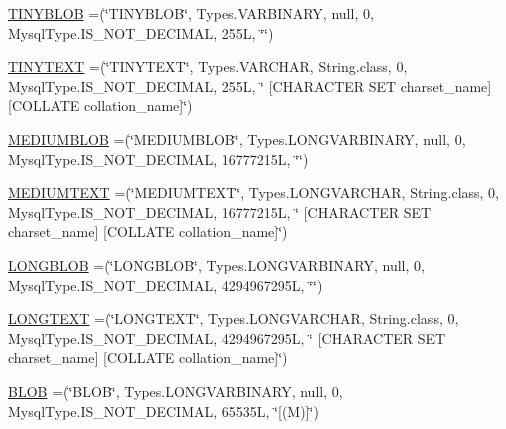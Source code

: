 \begin{DoxyCompactItemize}
\item 
\mbox{\hyperlink{enumcom_1_1mysql_1_1cj_1_1_mysql_type_a55c5e7d63a690905687b7fa55342dd9c}{T\+I\+N\+Y\+B\+L\+OB}} =(\char`\"{}T\+I\+N\+Y\+B\+L\+OB\char`\"{}, Types.\+V\+A\+R\+B\+I\+N\+A\+RY, null, 0, Mysql\+Type.\+I\+S\+\_\+\+N\+O\+T\+\_\+\+D\+E\+C\+I\+M\+AL, 255\+L, \char`\"{}\char`\"{})
\item 
\mbox{\hyperlink{enumcom_1_1mysql_1_1cj_1_1_mysql_type_a86e06f00235ee92184960c872d76076f}{T\+I\+N\+Y\+T\+E\+XT}} =(\char`\"{}T\+I\+N\+Y\+T\+E\+XT\char`\"{}, Types.\+V\+A\+R\+C\+H\+AR, String.\+class, 0, Mysql\+Type.\+I\+S\+\_\+\+N\+O\+T\+\_\+\+D\+E\+C\+I\+M\+AL, 255\+L, \char`\"{} \mbox{[}\+C\+H\+A\+R\+A\+C\+T\+E\+R S\+E\+T charset\+\_\+name\mbox{]} \mbox{[}\+C\+O\+L\+L\+A\+T\+E collation\+\_\+name\mbox{]}\char`\"{})
\item 
\mbox{\hyperlink{enumcom_1_1mysql_1_1cj_1_1_mysql_type_a7a690573bfaf820db73489978040f19d}{M\+E\+D\+I\+U\+M\+B\+L\+OB}} =(\char`\"{}M\+E\+D\+I\+U\+M\+B\+L\+OB\char`\"{}, Types.\+L\+O\+N\+G\+V\+A\+R\+B\+I\+N\+A\+RY, null, 0, Mysql\+Type.\+I\+S\+\_\+\+N\+O\+T\+\_\+\+D\+E\+C\+I\+M\+AL, 16777215\+L, \char`\"{}\char`\"{})
\item 
\mbox{\hyperlink{enumcom_1_1mysql_1_1cj_1_1_mysql_type_a8152d42c2961d0e081e76dbbadd7b4f2}{M\+E\+D\+I\+U\+M\+T\+E\+XT}} =(\char`\"{}M\+E\+D\+I\+U\+M\+T\+E\+XT\char`\"{}, Types.\+L\+O\+N\+G\+V\+A\+R\+C\+H\+AR, String.\+class, 0, Mysql\+Type.\+I\+S\+\_\+\+N\+O\+T\+\_\+\+D\+E\+C\+I\+M\+AL, 16777215\+L, \char`\"{} \mbox{[}\+C\+H\+A\+R\+A\+C\+T\+E\+R S\+E\+T charset\+\_\+name\mbox{]} \mbox{[}\+C\+O\+L\+L\+A\+T\+E collation\+\_\+name\mbox{]}\char`\"{})
\item 
\mbox{\hyperlink{enumcom_1_1mysql_1_1cj_1_1_mysql_type_ae25524b95c3afb1577b4e86a9b1f9fca}{L\+O\+N\+G\+B\+L\+OB}} =(\char`\"{}L\+O\+N\+G\+B\+L\+OB\char`\"{}, Types.\+L\+O\+N\+G\+V\+A\+R\+B\+I\+N\+A\+RY, null, 0, Mysql\+Type.\+I\+S\+\_\+\+N\+O\+T\+\_\+\+D\+E\+C\+I\+M\+AL, 4294967295\+L, \char`\"{}\char`\"{})
\item 
\mbox{\hyperlink{enumcom_1_1mysql_1_1cj_1_1_mysql_type_a2c64c15b3f4f30e58cf638130fa67a07}{L\+O\+N\+G\+T\+E\+XT}} =(\char`\"{}L\+O\+N\+G\+T\+E\+XT\char`\"{}, Types.\+L\+O\+N\+G\+V\+A\+R\+C\+H\+AR, String.\+class, 0, Mysql\+Type.\+I\+S\+\_\+\+N\+O\+T\+\_\+\+D\+E\+C\+I\+M\+AL, 4294967295\+L, \char`\"{} \mbox{[}\+C\+H\+A\+R\+A\+C\+T\+E\+R S\+E\+T charset\+\_\+name\mbox{]} \mbox{[}\+C\+O\+L\+L\+A\+T\+E collation\+\_\+name\mbox{]}\char`\"{})
\item 
\mbox{\hyperlink{enumcom_1_1mysql_1_1cj_1_1_mysql_type_ab5c20c6e73cfab558b68240c5087aa47}{B\+L\+OB}} =(\char`\"{}B\+L\+OB\char`\"{}, Types.\+L\+O\+N\+G\+V\+A\+R\+B\+I\+N\+A\+RY, null, 0, Mysql\+Type.\+I\+S\+\_\+\+N\+O\+T\+\_\+\+D\+E\+C\+I\+M\+AL, 65535\+L, \char`\"{}\mbox{[}(\+M)\mbox{]}\char`\"{})

\end{DoxyCompactItemize}
